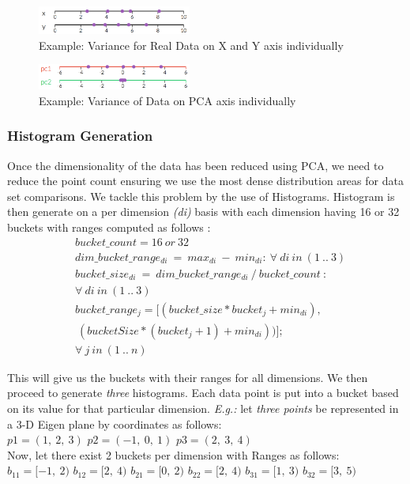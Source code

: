 \documentclass{vldb}
\begin{document}
 \begin{figure}[t!]
    \includegraphics[width=0.45\textwidth]{pca_real_data_axis}
    \caption{Example: Variance for Real Data on X and Y axis individually}
    \centering
    \label{pca_real_data_on_axis}
\end{figure}

\begin{figure}[t!]
    \includegraphics[width=0.45\textwidth]{pca_proj_data_axis}
    \caption{Example: Variance of Data on PCA axis individually}
    \centering
    \label{pca_real_data_on_axis}
\end{figure}
  
\subsubsection{Histogram Generation}
\label{hist_generation}
  Once the dimensionality of the data has been reduced using PCA, we need to reduce the point count ensuring we use the most dense distribution areas for data set comparisons. We tackle this problem by the use of Histograms.
Histogram is then generate on a per dimension \textit{(di)} basis with each dimension having 16 or 32 buckets with ranges computed as follows : 
\begin{equation}
     \begin{aligned}
       & bucket\_count = 16 \ or \ 32 \\
       & dim\_bucket\_range_{di}\ =\ max_{di} \ - \ min_{di}: \ \forall\ di\  in\ (1\ ..\ 3) \\
       & bucket\_size_{di} \ = \ dim\_bucket\_range_{di} \ / \    bucket\_count\ :\\
       & \forall\ di\ in\ (1\ ..\ 3) \\
       &  bucket\_range_j = [(bucket\_size * bucket_j + min_{di}),\\ 
       & \                  (bucketSize * (bucket_j + 1) + min_{di}))]; \\
       & \forall\ j\ in \ (1\ .. \ n)
     \end{aligned}
\end{equation}

This will give us the buckets with their ranges for all dimensions. We then proceed to generate \textit{three} histograms. Each data point is put into a bucket based on its value for that particular dimension. 
\textit{E.g.:} let \textit{three points} be represented in a 3-D Eigen plane by coordinates as follows: \\
$p1 = (1,\ 2,\ 3)$
$p2 = (-1,\ 0,\ 1)$
$p3 = (2,\ 3,\ 4)$ \\ 
Now, let there exist 2 buckets per dimension with Ranges as follows:  \\
$b_{11} = [-1,\ 2)$
$b_{12} = [2,\ 4)$
$b_{21} = [0, \ 2)$
$b_{22} = [2, \ 4)$
$b_{31} = [1, \ 3)$
$b_{32} = [3, \ 5)$ \\
\end{document}
